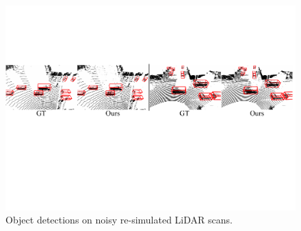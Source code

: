 \documentclass[10pt,twocolumn,letterpaper]{article}
\begin{document}
\begin{table}[t]
    \setlength{\tabcolsep}{4pt}
    \renewcommand{\arraystretch}{1.2}
	\centering
    
	\caption{Results of future frame simulation.}
	\label{tab:future_frame_quant}
    
\end{table}

\begin{figure}[t]
   \centering
   \includegraphics[width=1\linewidth]{Figures_rebuttal/noisypoints.pdf}
   
   \caption{
   Object detections on noisy re-simulated LiDAR scans. 
   }
    
   \label{fig:noisypoints}
\end{figure}


{
    \scriptsize
    
    
}
\end{document}
